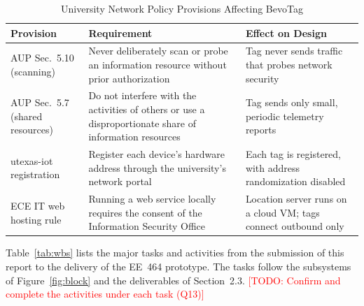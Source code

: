 \documentclass[12pt,letterpaper]{article}
\newenvironment{spectable}{\setstretch{1.0}\renewcommand{\arraystretch}{1.1}}{}
\newcommand{\TODO}[1]{\textcolor{red}{[TODO: #1]}}
\begin{document}
\begin{table}[H]
\caption{University Network Policy Provisions Affecting BevoTag}
\label{tab:aaup}
\centering
\begin{spectable}
\begin{tabularx}{\linewidth}{@{}L{1.7in} Y Y@{}}
\toprule
\textbf{Provision} & \textbf{Requirement} & \textbf{Effect on Design} \\
\midrule
AUP Sec.~5.10 (scanning) & Never deliberately scan or probe an information resource without prior authorization & Tag never sends traffic that probes network security \\
AUP Sec.~5.7 (shared resources) & Do not interfere with the activities of others or use a disproportionate share of information resources & Tag sends only small, periodic telemetry reports \\
utexas-iot registration & Register each device's hardware address through the university's network portal & Each tag is registered, with address randomization disabled \\
ECE IT web hosting rule & Running a web service locally requires the consent of the Information Security Office & Location server runs on a cloud VM; tags connect outbound only \\
\bottomrule
\end{tabularx}
\end{spectable}
\end{table}

Table~\ref{tab:wbs} lists the major tasks and activities from the submission of this report to the
delivery of the EE~464 prototype. The tasks follow the subsystems of Figure~\ref{fig:block} and the
deliverables of Section~2.3. \TODO{Confirm and complete the activities under each task (Q13)}
\end{document}
